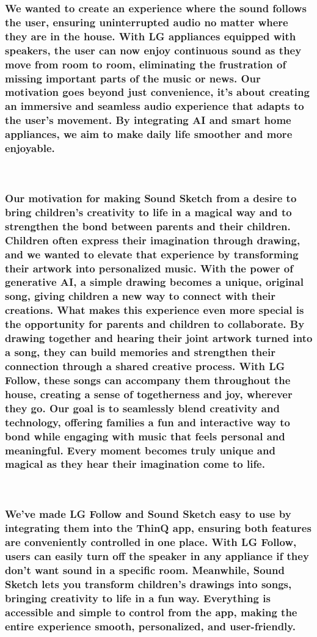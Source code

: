 \documentclass[conference]{IEEEtran}
\begin{document}
\subsubsection{We wanted to create an experience where the sound follows the user, ensuring uninterrupted audio no matter where they are in the house. With LG appliances equipped with speakers, the user can now enjoy continuous sound as they move from room to room, eliminating the frustration of missing important parts of the music or news.
Our motivation goes beyond just convenience, it’s about creating an immersive and seamless audio experience that adapts to the user's movement. By integrating AI and smart home appliances, we aim to make daily life smoother and more enjoyable.}
\

\subsubsection{Our motivation for making Sound Sketch from a desire to bring children's creativity to life in a magical way and to strengthen the bond between parents and their children. Children often express their imagination through drawing, and we wanted to elevate that experience by transforming their artwork into personalized music. With the power of generative AI, a simple drawing becomes a unique, original song, giving children a new way to connect with their creations.
What makes this experience even more special is the opportunity for parents and children to collaborate. By drawing together and hearing their joint artwork turned into a song, they can build memories and strengthen their connection through a shared creative process. With LG Follow, these songs can accompany them throughout the house, creating a sense of togetherness and joy, wherever they go.
Our goal is to seamlessly blend creativity and technology, offering families a fun and interactive way to bond while engaging with music that feels personal and meaningful. Every moment becomes truly unique and magical as they hear their imagination come to life.}


\
\subsubsection{We’ve made LG Follow and Sound Sketch easy to use by integrating them into the ThinQ app, ensuring both features are conveniently controlled in one place. With LG Follow, users can easily turn off the speaker in any appliance if they don’t want sound in a specific room. Meanwhile, Sound Sketch lets you transform children's drawings into songs, bringing creativity to life in a fun way. Everything is accessible and simple to control from the app, making the entire experience smooth, personalized, and user-friendly.}
\end{document}
